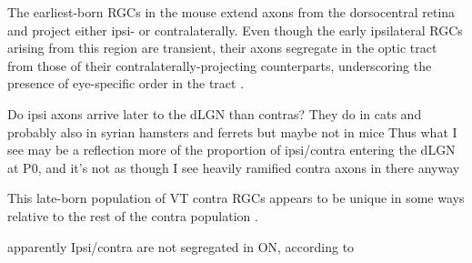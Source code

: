 %



The earliest-born RGCs in the mouse extend axons from the dorsocentral retina and project either ipsi- or contralaterally.
Even though the early ipsilateral RGCs arising from this region are transient, their axons segregate in the optic tract from those of their contralaterally-projecting counterparts, underscoring the presence of eye-specific order in the tract \cite{soares2015transient}.


Do ipsi axons arrive later to the dLGN than contras? 
They do in cats \cite{shatz1983prenatal} and probably also in syrian hamsters \cite{frost1979postnatal} and ferrets \cite{linden1981dorsal}
but maybe not in mice \cite{dhande2011development}
Thus what I see may be a reflection more of the proportion of ipsi/contra entering the dLGN at P0, and it's not as though I see heavily ramified contra axons in there anyway



This late-born population of VT contra RGCs appears to be unique in some ways relative to the rest of the contra population \cite{williams2006role}.


apparently Ipsi/contra are not segregated in ON, according to \cite{baker1989distribution}